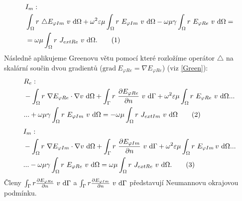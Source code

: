 \documentclass[12pt,a4paper,oneside]{article}
\numberwithin{equation}{section} %
\numberwithin{figure}{section} %
\numberwithin{table}{section} %
\newcommand{\grad}{\mathrm{grad}\ }
\newcommand\numberthis{\addtocounter{equation}{1}\tag{\theequation}}
\begin{document}
\begin{align*}
&I_m:
\\
&\int _{\Omega} r ~ \triangle E _{\varphi Im} ~ v ~ \ud \Omega + \omega ^2 \varepsilon \mu \int _{\Omega} r ~ E _{\varphi Im} ~ v ~ \ud \Omega - \omega \mu \gamma \int _{\Omega} r ~ E _{\varphi Re} ~ v ~ \ud \Omega =\\ 
&= \omega \mu \int _{\Omega} r ~ J _{extRe} ~ v ~ \ud \Omega .
\numberthis
\end{align*}
Následně aplikujeme Greenovu větu pomocí které rozložíme operátor $\triangle$ na skalární součin dvou gradientů ($\grad E _{\varphi Re} = \nabla E _{\varphi Re}$) (viz \ref{Green}):
\begin{align*}
&R_e:
\\
&- \int _{\Omega} r ~ \nabla E _{\varphi Re} \cdot \nabla v ~ \ud \Omega + \int _{\Gamma} r ~ \frac{\partial E _{\varphi Re}}{\partial n} ~ v ~ \ud \Gamma + \omega ^2 \varepsilon \mu \int _{\Omega} r ~ E _{\varphi Re} ~ v ~ \ud \Omega...\\
&...+ \omega \mu \gamma \int _{\Omega} r ~ E _{\varphi Im} ~ v ~ \ud \Omega = - \omega \mu \int _{\Omega} r ~ J _{extIm} ~ v ~ \ud \Omega
\numberthis
\end{align*}
\begin{align*}
&I_m:
\\
&- \int _{\Omega} r ~ \nabla E _{\varphi Im} \cdot \nabla v ~ \ud \Omega + \int _{\Gamma} r ~ \frac{\partial E _{\varphi Im}}{\partial n} ~ v ~ \ud \Gamma + \omega ^2 \varepsilon \mu \int _{\Omega} r ~ E _{\varphi Im} \! ~ v ~ \ud \Omega...\\ 
&...- \omega \mu \gamma \int _{\Omega} r ~ E _{\varphi Re} ~ v ~ \ud \Omega = \omega \mu \int _{\Omega} r ~ J _{extRe} ~ v ~ \ud \Omega .
\numberthis
\end{align*}
Členy $\int _{\Gamma} r \frac{\partial E _{\varphi Re}}{\partial n} ~ v ~ \mathrm{d} \Gamma$ a $\int _{\Gamma} r \frac{\partial E _{\varphi Im}}{\partial n} ~ v ~ \mathrm{d} \Gamma$ představují Neumannovu okrajovou podmínku.
\end{document}
